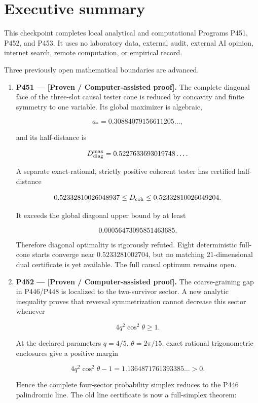 \documentclass[11pt,a4paper,openany]{report}
\begin{document}
\chapter{Executive summary}

This checkpoint completes local analytical and computational Programs P451, P452, and P453. It uses no laboratory data, external audit, external AI opinion, internet search, remote computation, or empirical record.

Three previously open mathematical boundaries are advanced.

\begin{enumerate}
\item 
\textbf{P451 --- [Proven /\allowbreak{} Computer-assisted proof].} The complete diagonal face of the three-slot causal tester cone is reduced by concavity and finite symmetry to one variable. Its global maximizer is algebraic,

\[
   a_* = 0.30884079156611205\ldots,
   \]

and its half-distance is

\[
   D_{\rm diag}^{\max}=0.5227633693019748\ldots .
   \]

A separate exact-rational, strictly positive coherent tester has certified half-distance

\[
   0.52332810026048937
   \le D_{\rm coh}\le
   0.52332810026049204.
   \]

It exceeds the global diagonal upper bound by at least

\[
   0.00056473095851463685.
   \]

Therefore diagonal optimality is rigorously refuted. Eight deterministic full-cone starts converge near \(0.5233281002704\), but no matching 21-dimensional dual certificate is yet available. The full causal optimum remains open.

\item 
\textbf{P452 --- [Proven /\allowbreak{} Computer-assisted proof].} The coarse-graining gap in P446/\allowbreak{}P448 is localized to the two-survivor sector. A new analytic inequality proves that reversal symmetrization cannot decrease this sector whenever

\[
   4q^2\cos^2\theta\ge 1.
   \]

At the declared parameters \(q=4/5\), \(\theta=2\pi/15\), exact rational trigonometric enclosures give a positive margin

\[
   4q^2\cos^2\theta-1
   =1.1364871761393385\ldots>0.
   \]

Hence the complete four-sector probability simplex reduces to the P446 palindromic line. The old line certificate is now a full-simplex theorem:


\end{enumerate}
\end{document}
